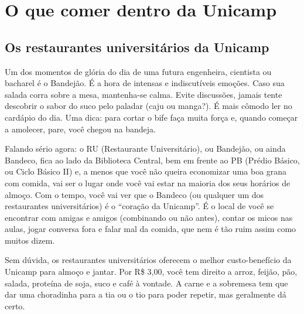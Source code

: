 
%
%
%

\section{O que comer dentro da Unicamp}
\subsection{Os restaurantes universitários da Unicamp}

Um dos momentos de glória do dia de uma futura engenheira, cientista ou
bacharel é o Bandejão. É a hora de intensas e indiscutíveis emoções. Caso sua
salada corra sobre a mesa, mantenha-se calma. Evite discussões, jamais tente
descobrir o sabor do suco pelo paladar (caju ou manga?). É mais cômodo ler no
cardápio do dia. Uma dica: para cortar o bife faça muita força e, quando
começar a amolecer, pare, você chegou na bandeja.

Falando sério agora: o RU (Restaurante Universitário), ou Bandejão, ou ainda
Bandeco, fica ao lado da Biblioteca Central, bem em frente ao PB (Prédio
Básico, ou Ciclo Básico II) e, a menos que você não queira economizar uma boa
grana com comida, vai ser o lugar onde você vai estar na maioria dos seus
horários de almoço. Com o tempo, você vai ver que o Bandeco (ou qualquer um dos
restaurantes universitários) é o ``coração da Unicamp''. É o local de você se
encontrar com amigas e amigos (combinando ou não antes), contar os micos nas
aulas, jogar conversa fora e falar mal da comida, que nem é tão ruim assim como
muitos dizem.


Sem dúvida, os restaurantes universitários oferecem o melhor custo-benefício da
Unicamp para almoço e jantar. Por R\$ 3,00, você tem direito a arroz, feijão,
pão, salada, proteína de soja, suco e café à vontade. A carne e a sobremesa tem
que dar uma choradinha para a tia ou o tio para poder repetir, mas geralmente
dá certo.

